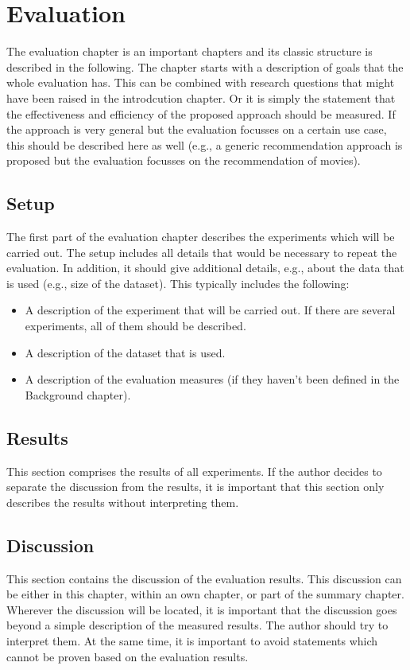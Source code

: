 \chapter{Evaluation}
\label{ch:evaluation}

The evaluation chapter is an important chapters and its classic structure is described in the following. The chapter starts with a description of goals that the whole evaluation has. This can be combined with research questions that might have been raised in the introdcution chapter. Or it is simply the statement that the effectiveness and efficiency of the proposed approach should be measured. If the approach is very general but the evaluation focusses on a certain use case, this should be described here as well (e.g., a generic recommendation approach is proposed but the evaluation focusses on the recommendation of movies).

\section{Setup}

The first part of the evaluation chapter describes the experiments which will be carried out. The setup includes all details that would be necessary to repeat the evaluation. In addition, it should give additional details, e.g., about the data that is used (e.g., size of the dataset).
This typically includes the following:
\begin{itemize}
\item A description of the experiment that will be carried out. If there are several experiments, all of them should be described.
\item A description of the dataset that is used.
\item A description of the evaluation measures (if they haven't been defined in the Background chapter).
\end{itemize}

\section{Results}

This section comprises the results of all experiments. If the author decides to separate the discussion from the results, it is important that this section only describes the results without interpreting them.

\section{Discussion}

This section contains the discussion of the evaluation results. This discussion can be either in this chapter, within an own chapter, or part of the summary chapter. Wherever the discussion will be located, it is important that the discussion goes beyond a simple description of the measured results. The author should try to interpret them. At the same time, it is important to avoid statements which cannot be proven based on the evaluation results.